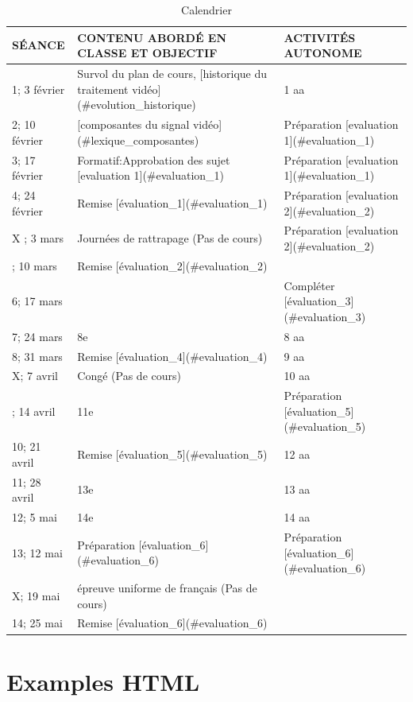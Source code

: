\documentclass[
]{book}
\begin{document}
\begin{table}

\caption{\label{tab:calendrier}Calendrier}
\centering
\begin{tabular}[t]{lll}
\toprule
SÉANCE & CONTENU ABORDÉ EN CLASSE ET OBJECTIF & ACTIVITÉS AUTONOME\\
\midrule
1; 3 février & Survol du plan de cours, [historique du traitement vidéo](\#evolution\_historique) & 1 aa\\
2; 10 février & [composantes du signal vidéo](\#lexique\_composantes) & Préparation [evaluation 1](\#evaluation\_1)\\
3; 17 février & Formatif:Approbation des sujet [evaluation 1](\#evaluation\_1) & Préparation [evaluation 1](\#evaluation\_1)\\
4; 24 février & Remise [évaluation\_1](\#evaluation\_1) & Préparation [evaluation 2](\#evaluation\_2)\\
X ; 3 mars & Journées de rattrapage (Pas de cours) & Préparation [evaluation 2](\#evaluation\_2)\\
\addlinespace
5; 10 mars & Remise [évaluation\_2](\#evaluation\_2) & \\
6; 17 mars &  & Compléter [évaluation\_3](\#evaluation\_3)\\
7; 24 mars & 8e & 8 aa\\
8; 31 mars & Remise [évaluation\_4](\#evaluation\_4) & 9 aa\\
X; 7 avril & Congé (Pas de cours) & 10 aa\\
\addlinespace
9; 14 avril & 11e & Préparation [évaluation\_5](\#evaluation\_5)\\
10; 21 avril & Remise [évaluation\_5](\#evaluation\_5) & 12 aa\\
11; 28 avril & 13e & 13 aa\\
12; 5 mai & 14e & 14 aa\\
13; 12 mai & Préparation [évaluation\_6](\#evaluation\_6) & Préparation [évaluation\_6](\#evaluation\_6)\\
\addlinespace
X; 19 mai & épreuve uniforme de français (Pas de cours) & \\
14; 25 mai & Remise [évaluation\_6](\#evaluation\_6) & \\
\bottomrule
\end{tabular}
\end{table}

\hypertarget{examples-html}{%
\chapter{Examples HTML}\label{examples-html}}
\end{document}
